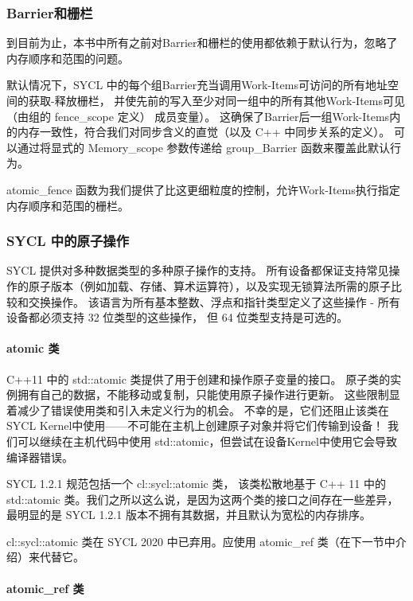 \subsubsection{Barrier和栅栏}
到目前为止，本书中所有之前对Barrier和栅栏的使用都依赖于默认行为，忽略了内存顺序和范围的问题。

默认情况下，SYCL 中的每个组Barrier充当调用Work-Items可访问的所有地址空间的获取-释放栅栏，
并使先前的写入至少对同一组中的所有其他Work-Items可见（由组的 fence\_scope 定义） 成员变量）。 
这确保了Barrier后一组Work-Items内的内存一致性，符合我们对同步含义的直觉（以及 C++ 中同步关系的定义）。 
可以通过将显式的 Memory\_scope 参数传递给 group\_Barrier 函数来覆盖此默认行为。

atomic\_fence 函数为我们提供了比这更细粒度的控制，允许Work-Items执行指定内存顺序和范围的栅栏。

\subsubsection{SYCL 中的原子操作}
SYCL 提供对多种数据类型的多种原子操作的支持。 
所有设备都保证支持常见操作的原子版本（例如加载、存储、算术运算符），以及实现无锁算法所需的原子比较和交换操作。 
该语言为所有基本整数、浮点和指针类型定义了这些操作 - 所有设备都必须支持 32 位类型的这些操作，
但 64 位类型支持是可选的。

\paragraph{atomic 类}

C++11 中的 std::atomic 类提供了用于创建和操作原子变量的接口。 
原子类的实例拥有自己的数据，不能移动或复制，只能使用原子操作进行更新。 
这些限制显着减少了错误使用类和引入未定义行为的机会。 
不幸的是，它们还阻止该类在 SYCL Kernel中使用——不可能在主机上创建原子对象并将它们传输到设备！ 
我们可以继续在主机代码中使用 std::atomic，但尝试在设备Kernel中使用它会导致编译器错误。

\begin{remark}
SYCL 1.2.1 规范包括一个 cl::sycl::atomic 类，
该类松散地基于 C++ 11 中的 std::atomic 类。我们之所以这么说，是因为这两个类的接口之间存在一些差异，
最明显的是 SYCL 1.2.1 版本不拥有其数据，并且默认为宽松的内存排序。
\end{remark}

cl::sycl::atomic 类在 SYCL 2020 中已弃用。应使用 atomic\_ref 类（在下一节中介绍）来代替它。

\paragraph{atomic\_ref 类}


